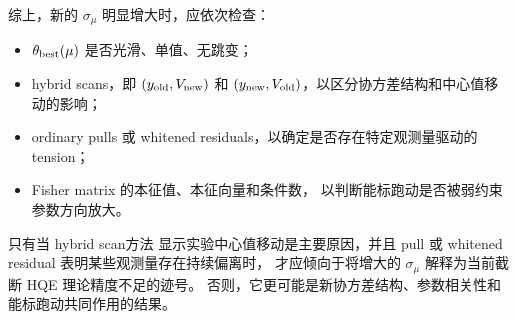 综上，新的 \(\sigma_\mu\) 明显增大时，应依次检查：
\begin{itemize}
    \item \(\theta_{\rm best}(\mu)\) 是否光滑、单值、无跳变；
    \item hybrid scans，即
    \((y_{\rm old},V_{\rm new})\) 和
    \((y_{\rm new},V_{\rm old})\)，以区分协方差结构和中心值移动的影响；
    \item ordinary pulls 或 whitened residuals，以确定是否存在特定观测量驱动的 tension；
    \item Fisher matrix 的本征值、本征向量和条件数，
    以判断能标跑动是否被弱约束参数方向放大。
\end{itemize}
只有当 hybrid scan方法 显示实验中心值移动是主要原因，并且 pull 或 whitened residual 表明某些观测量存在持续偏离时，
才应倾向于将增大的 \(\sigma_\mu\) 解释为当前截断 HQE 理论精度不足的迹号。
否则，它更可能是新协方差结构、参数相关性和能标跑动共同作用的结果。
